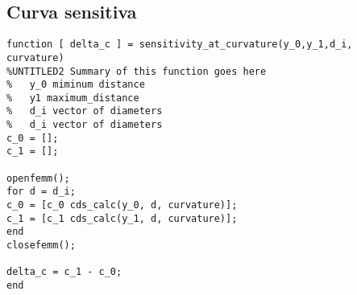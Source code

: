 \subsection{Curva sensitiva}

\begin{lstlisting}[frame=single]
function [ delta_c ] = sensitivity_at_curvature(y_0,y_1,d_i, curvature)
%UNTITLED2 Summary of this function goes here
%   y_0 miminum distance
%   y1 maximum_distance
%   d_i vector of diameters
%   d_i vector of diameters
c_0 = [];
c_1 = [];

openfemm();
for d = d_i;
c_0 = [c_0 cds_calc(y_0, d, curvature)];
c_1 = [c_1 cds_calc(y_1, d, curvature)];
end
closefemm();

delta_c = c_1 - c_0;
end



\end{lstlisting}